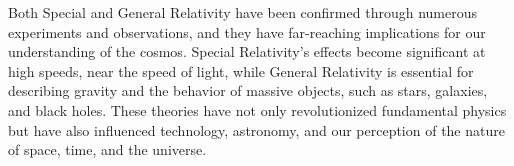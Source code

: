 Both Special and General Relativity have been confirmed through numerous experiments and observations, and they have far-reaching implications for our understanding of the cosmos. Special Relativity's effects become significant at high speeds, near the speed of light, while General Relativity is essential for describing gravity and the behavior of massive objects, such as stars, galaxies, and black holes. These theories have not only revolutionized fundamental physics but have also influenced technology, astronomy, and our perception of the nature of space, time, and the universe.











%






